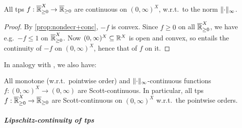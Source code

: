 \begin{theorem}\label{thm:cont}
 All tps $f:\overline{\mathbb{R}}_{\geq 0}^X\to\overline{\mathbb{R}}_{\geq 0}$ are continuous on $(0,\infty)^X$, w.r.t.\ to the norm $\lVert\cdot\rVert_\infty$.
\end{theorem}
\begin{proof}
By \autoref{prop:nondecr+conc}, $-f$ is convex.
Since $f\geq 0$ on all $\overline{\mathbb{R}}_{\geq 0}^X$, we have e.g.\ $-f\leq 1$ on $\overline{\mathbb{R}}_{\geq 0}^X$.
Now $(0,\infty)^X\subseteq \mathbb{R}^X$ is open and convex, %
so \cite[Proposition 4.4.(3)]{Cobzas2017} entails the continuity of $-f$ on $(0,\infty)^X$, hence that of $f$ on it.
\end{proof}

In analogy with \cite[Proposition 17]{DanEhrh2011}, we also have:

\begin{theorem}\label{thm:ScottCont}
 All monotone (w.r.t.\ pointwise order) and $\lVert\cdot\rVert_{\infty}$-continuous functions $f:(0,\infty)^X\to (0,\infty)$ are Scott-continuous.
 In particular, all tps $f:\overline{\mathbb{R}}_{\geq 0}^X\to\overline{\mathbb{R}}_{\geq 0}$ are Scott-continuous on $(0,\infty)^X$ w.r.t.\ the pointwise orders.
\end{theorem}



\subparagraph*{Lipschitz-continuity of tps}\label{sec:4C}%



